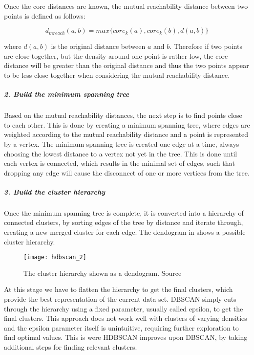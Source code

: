 Once the core distances are known, the mutual reachability distance between two points is defined as follows:

\begin{equation*}
    d_{mreach}(a, b) = max\{core_k(a), core_k(b), d(a, b)\}
\end{equation*}

where $d(a, b)$ is the original distance between $a$ and $b$.
Therefore if two points are close together, but the density around one point is rather low,
the core distance will be greater than the original distance and thus the two points appear to be less close together
when considering the mutual reachability distance.

\subparagraph{2. Build the minimum spanning tree}
Based on the mutual reachability distances, the next step is to find points close to each other.
This is done by creating a minimum spanning tree,
where edges are weighted according to the mutual reachability distance and a point is represented by a vertex.
The minimum spanning tree is created one edge at a time,
always choosing the lowest distance to a vertex not yet in the tree.
This is done until each vertex is connected, which results in the minimal set of edges,
such that dropping any edge will cause the disconnect of one or more vertices from the tree.

\subparagraph{3. Build the cluster hierarchy}
Once the minimum spanning tree is complete, it is converted into a hierarchy of connected clusters,
by sorting edges of the tree by distance and iterate through, creating a new merged cluster for each edge.
The dendogram in  shows a possible cluster hierarchy. %

\begin{figure}[h]
    \centering
    \texttt{[image: hdbscan\_2]}
    \caption{
        The cluster hierarchy shown as a dendogram.
        Source\cite{how_hdbscan_works}
    }
    \label{fig:hdbscan_2}
\end{figure}

At this stage we have to flatten the hierarchy to get the final clusters,
which provide the best representation of the current data set.
DBSCAN simply cuts through the hierarchy using a fixed parameter, usually called epsilon, to get the final clusters.
This approach does not work well with clusters of varying densities and the epsilon parameter itself is unintuitive,
requiring further exploration to find optimal values.
This is were HDBSCAN improves upon DBSCAN, by taking additional steps for finding relevant clusters.

